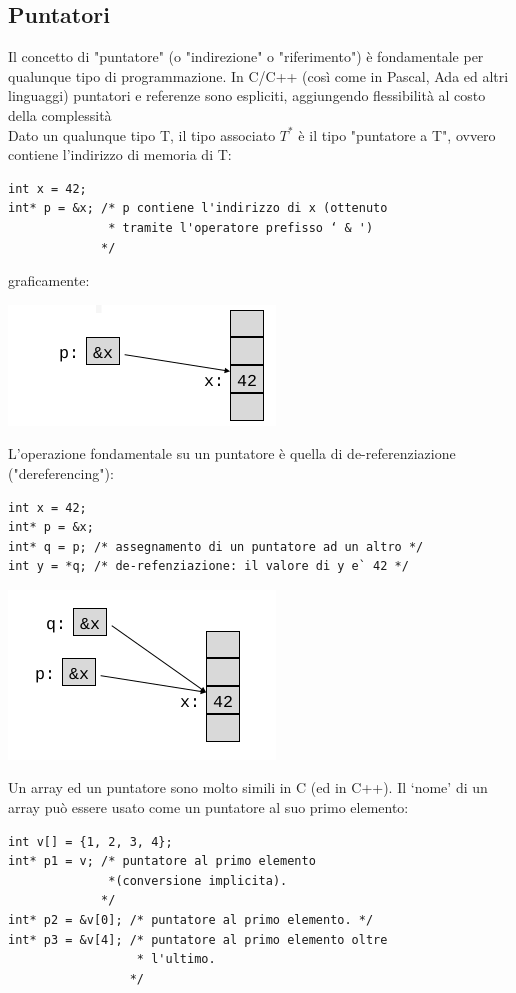 \documentclass[a4paper,12pt, oneside]{book}
\begin{document}
	\subsection{Puntatori}
	Il concetto di "puntatore" (o "indirezione" o "riferimento") è fondamentale per qualunque tipo di programmazione. In C/C++ (così come in Pascal, Ada ed altri linguaggi) puntatori
	e referenze sono espliciti, aggiungendo flessibilità al costo della complessità\\
	Dato un qualunque tipo T, il tipo associato $T^*$ è il tipo "puntatore a T", ovvero contiene l'indirizzo di memoria di T:
	\begin{verbatim}
int x = 42;
int* p = &x; /* p contiene l'indirizzo di x (ottenuto
              * tramite l'operatore prefisso ‘ & ')
             */
\end{verbatim}
	graficamente:
	\begin{center}
		\includegraphics[scale=3]{img/c.png}
	\end{center}
	L'operazione fondamentale su un puntatore è quella di
	de-referenziazione ("dereferencing"):
	\begin{verbatim}
int x = 42;
int* p = &x;
int* q = p; /* assegnamento di un puntatore ad un altro */
int y = *q; /* de-refenziazione: il valore di y e` 42 */
\end{verbatim}
	\begin{center}
		\includegraphics[scale=3]{img/c2.png}
	\end{center}
	\newpage
	Un array ed un puntatore sono molto simili in C (ed in C++). Il ‘nome' di un array può essere usato come un puntatore al suo primo elemento:
	\begin{verbatim}
int v[] = {1, 2, 3, 4};
int* p1 = v; /* puntatore al primo elemento
              *(conversione implicita).
             */
int* p2 = &v[0]; /* puntatore al primo elemento. */
int* p3 = &v[4]; /* puntatore al primo elemento oltre
                  * l'ultimo.
                 */
\end{verbatim}
\end{document}
